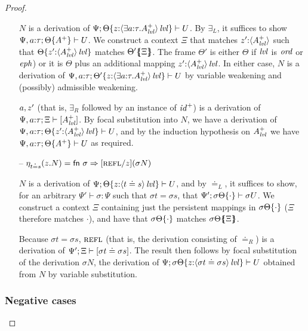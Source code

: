 \begin{proof}
\begin{itemize}
$N$ is a derivation of 
$\foc{\Psi}{\tackon{\Theta}{z{:}\islvl{\susp{\exists a{:}\tau. A^+_\mlvl}}}}
  {U}$.
By $\exists_L$, it suffices to show 
$\foc{\Psi, a{:}\tau}{\tackon{\Theta}{A^+}}{U}$.
We construct a context $\Xi$ that matches
$z'{:}\susp{A^+_\mlvl}$ such that
$\tackon{\Theta}{z'{:}\islvl{\susp{A^+_\mlvl}}}$ matches
$\frameoff{\Theta'}{\Xi}$. The frame $\Theta'$ is either $\Theta$
if $\mlvl$ is $\mtrue$ or $\meph$) or it is $\Theta$ plus 
an additional mapping $z'{:}\islvl{\susp{A^+_\mlvl}}$. In either case,
$N$ is a derivation of 
$\foc{\Psi, a{:}\tau}
  {\tackon{\Theta'}{z{:}\islvl{\susp{\exists a{:}\tau. A^+_\mlvl}}}}
  {U}$ by variable weakening and (possibly) admissible weakening.

\smallskip
$\texistsr{a}{z'}$ (that is, $\exists_R$ followed by 
an instance of ${\it id}^+$) is a derivation of 
$\foc{\Psi, a{:}\tau}{\Xi}{[A^+_\mlvl]}$. By focal 
substitution into $N$, we have a derivation of 
$\foc{\Psi, a{:}\tau}{\tackon{\Theta}{z'{:}\islvl{\susp{A^+_\mlvl}}}}{U}$,
and by the induction hypothesis on $A^+_\mlvl$ we have
$\foc{\Psi, a{:}\tau}{\tackon{\Theta}{A^+}}{U}$ as required.

\smallskip

\item[--] $\etapa{z}{N}{t \doteq s} 
           = {\sf fn}~ \sigma \Rightarrow [\tunifr/z](\sigma{N})$
\smallskip

$N$ is a derivation of $\foc{\Psi}{\tackon{\Theta}{z{:}\islvl{\susp{t
        \doteq s}}}}{U}$, and by $\doteq_L$, it suffices to show, for
an arbitrary $\Psi' \vdash \sigma : \Psi$ such that $\sigma{t} =
\sigma{s}$, that
$\foc{\Psi'}{\tackon{\sigma\Theta}{\cdot}}{\sigma{U}}$.  We construct
a context $\Xi$ containing just the persistent mappings in
$\tackon{\sigma\Theta}{\cdot}$ ($\Xi$ therefore matches $\cdot$), and
have that $\tackon{\sigma\Theta}{\cdot}$ matches
$\frameoff{\sigma\Theta}{\Xi}$.

Because $\sigma{t} = \sigma{s}$, 
$\tunifr$ (that is, the derivation consisting of ${\doteq}_R$) is 
a derivation of $\foc{\Psi'}{\Xi}{[\sigma{t} \doteq \sigma{s}]}$.
The result then follows by focal substitution of
the derivation 
$\sigma{N}$, the derivation of 
$\foc{\Psi}{\tackon{\sigma\Theta}{z{:}\islvl{\susp{\sigma{t}
        \doteq \sigma{s}}}}}{U}$ obtained from $N$ by variable
substitution.

\end{itemize}

\subsubsection{Negative cases}


\end{proof}
